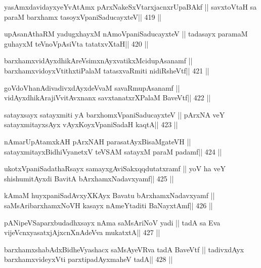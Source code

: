 \begin{shl}
yasAmxdavidayxyeYvA\s\s tAmx pArxNakeSxVtarxjacnxrUpaBAkf ||
savxtoV\s taH sa paraM barxhamx tasoyxVpaniSaducayxteV\hfill || 419 ||
\end{shl}

\begin{shl}
upAsanAthaRM yadugxhayxM nAmoVpaniSaducayxteV ||
tadasayx paramaM guhayxM teVnoVpAsiVta tatatxvXtaH\hfill || 420 ||
\end{shl}

\begin{shl}
barxhamxvidAyxdhikAreV\s simxnAyxvatikxMcidupAsanamf ||
barxhamxvidoyxVtithxtiPalaM tatasxvaRmiti nidiRsheVtf\hfill || 421 ||
\end{shl}

\begin{shl}
goVdoVhanAdivadivxdAyxdeVvaM savaRmupAsanamf ||
vidAyxdhikArajiVvitAvxnanx savxtanatxrXPalaM BaveVtf\hfill || 422 ||
\end{shl}

\begin{shl}
satayxsayx satayxmiti yA barxhomxVpaniSaducayxteV ||
pArxNA veY satayxmitayxsAyx vAyxKoyxVpaniSadaH kaqtA\hfill || 423 ||
\end{shl}

\begin{shl}
nAmarUpAtamxkAH pArxNAH parasatAyxBisaMgateVH ||
satayxmitayxBidhiVyanetxV teVSAM satayxM paraM padamf\hfill || 424 ||
\end{shl}

\begin{shl}
ukotxVpaniSadathaRsayx samayxgAviSakxqqdutatxramf ||
yoV ha veY shishumitAyxdi BavitA bArxhamxNadavxyamf\hfill || 425 ||
\end{shl}

\begin{shl}
kAmaM huyxpaniSadAvxyXKAyx Bavatu bArxhamxNadavxyamf ||
saMsAribarxhamxNoVH kasayx nAmeYtaditi BaNayxtAmf\hfill || 426 ||
\end{shl}

\begin{shl}
pANipeVSaparxbudadhxsayx nAma saMsAriNoV yadi ||
tadA sa Eva vijeVcnxyasatxjAjxcnXnAdeVva mukatxtA\hfill || 427 ||
\end{shl}

\begin{shl}
barxhamxshabAdxBidheVyashacx saMsAyeVRva tadA BaveVtf ||
tadivxdAyx barxhamxvideyxVti parxtipadAyxmaheV tadA\hfill || 428 ||
\end{shl}


